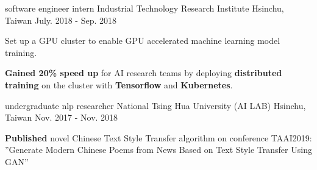 


\begin{cventries}







\cventry
{software engineer intern} %
{Industrial Technology Research Institute} %
{Hsinchu, Taiwan} %
{July. 2018 - Sep. 2018} %
{ %
\begin{cvitems}
\item {Set up a GPU cluster to enable GPU accelerated machine learning model training.}
\item {\textbf{Gained 20\% speed up} for AI research teams by deploying \textbf{distributed training} on the cluster with \textbf{Tensorflow} and \textbf{Kubernetes}.}
\end{cvitems}
}


\cventry
{undergraduate nlp researcher} %
{National Tsing Hua University (AI LAB)} %
{Hsinchu, Taiwan} %
{Nov. 2017 - Nov. 2018} %
{ %
\begin{cvitems}
\item {\textbf{Published} novel Chinese Text Style Transfer algorithm on conference TAAI2019: ”Generate Modern Chinese Poems from News
Based on Text Style Transfer Using GAN”}
\end{cvitems}
}


\end{cventries}